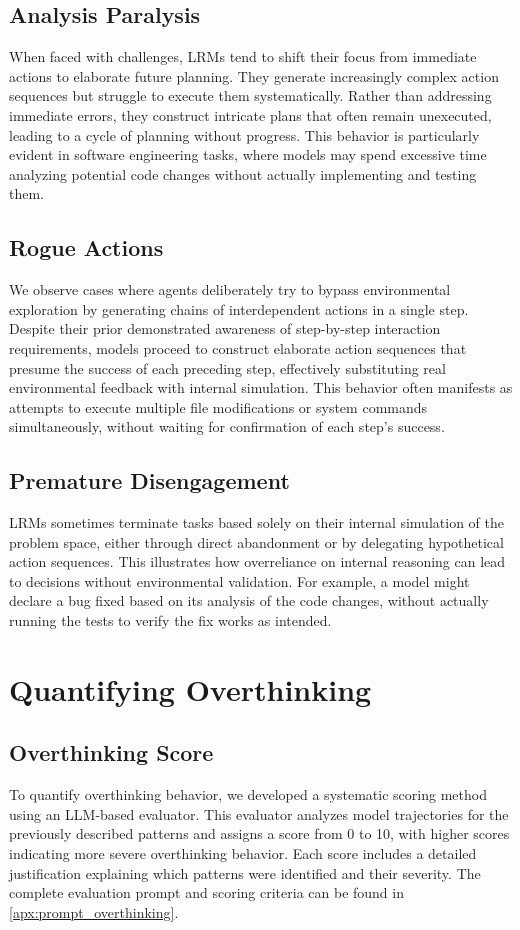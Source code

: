 \subsection{Analysis Paralysis}
When faced with challenges, LRMs tend to shift their focus from immediate actions to elaborate future planning. They generate increasingly complex action sequences but struggle to execute them systematically. Rather than addressing immediate errors, they construct intricate plans that often remain unexecuted, leading to a cycle of planning without progress. This behavior is particularly evident in software engineering tasks, where models may spend excessive time analyzing potential code changes without actually implementing and testing them.

\subsection{Rogue Actions}
We observe cases where agents deliberately try to bypass environmental exploration by generating chains of interdependent actions in a single step. Despite their prior demonstrated awareness of step-by-step interaction requirements, models proceed to construct elaborate action sequences that presume the success of each preceding step, effectively substituting real environmental feedback with internal simulation. This behavior often manifests as attempts to execute multiple file modifications or system commands simultaneously, without waiting for confirmation of each step's success.

\subsection{Premature Disengagement}
LRMs sometimes terminate tasks based solely on their internal simulation of the problem space, either through direct abandonment or by delegating hypothetical action sequences. This illustrates how overreliance on internal reasoning can lead to decisions without environmental validation. For example, a model might declare a bug fixed based on its analysis of the code changes, without actually running the tests to verify the fix works as intended.

\section{Quantifying Overthinking}
\label{sec:quantifying}

\subsection{Overthinking Score}
To quantify overthinking behavior, we developed a systematic scoring method using an LLM-based evaluator. This evaluator analyzes model trajectories for the previously described patterns and assigns a score from 0 to 10, with higher scores indicating more severe overthinking behavior. Each score includes a detailed justification explaining which patterns were identified and their severity. The complete evaluation prompt and scoring criteria can be found in \cref{apx:prompt_overthinking}.

